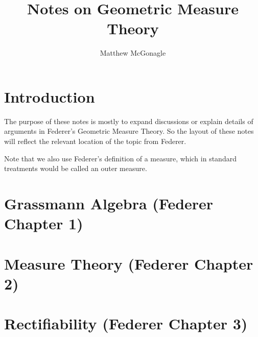 \documentclass{article}
\begin{document}
\title{Notes on Geometric Measure Theory}
\author{Matthew McGonagle}
\maketitle
\section{Introduction}
The purpose of these notes is mostly to expand discussions or explain details of arguments
in Federer's Geometric Measure Theory. So the layout of these notes will reflect the relevant location
of the topic from Federer.

Note that we also use Federer's definition of a measure, which in standard treatments would be called
an outer measure.

\section{Grassmann Algebra (Federer Chapter 1)}


\section{Measure Theory (Federer Chapter 2)}




\section{Rectifiability (Federer Chapter 3)}

\end{document}
